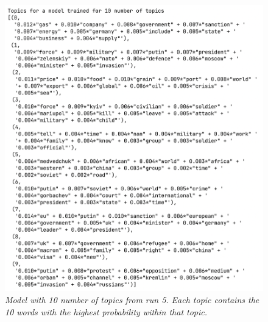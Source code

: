 \documentclass[twoside,12pt,a4paper]{article}
\begin{document}
\begin{figure}[h]
\centering
\includegraphics[scale=0.5]{10_topics.png}
\caption{\textit{Model with 10 number of topics from run 5. Each topic contains the 10 words with the highest probability within that topic.}}
\label{fig:10_topics}
\end{figure}
\end{document}
